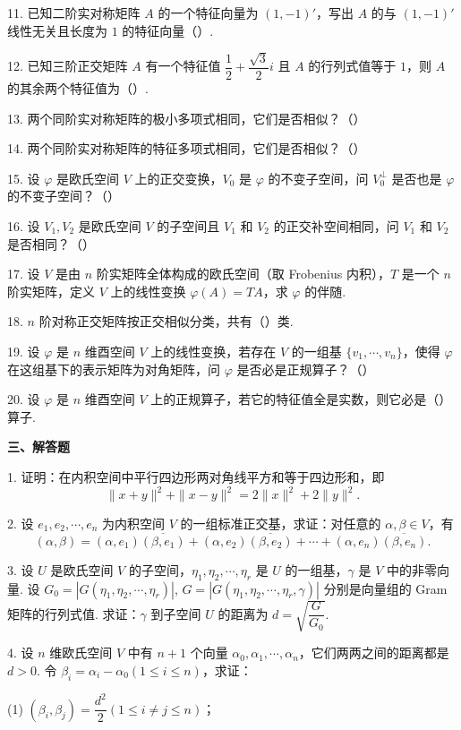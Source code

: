 \documentclass[UTF8, 12pt, fontset=fandol, oneside]{ctexart}
\begin{document}
11. 已知二阶实对称矩阵 $A$ 的一个特征向量为 $(1,-1)'$，写出 $A$ 的与 $(1,-1)'$ 线性无关且长度为 $1$ 的特征向量（\quad ）.

12. 已知三阶正交矩阵 $A$ 有一个特征值 $\dfrac{1}{2}+\dfrac{\sqrt{3}}{2}i$ 且 $A$ 的行列式值等于 $1$，则 $A$ 的其余两个特征值为（\quad ）.

13. 两个同阶实对称矩阵的极小多项式相同，它们是否相似？（\quad ）

14. 两个同阶实对称矩阵的特征多项式相同，它们是否相似？（\quad ）

15. 设 $\varphi$ 是欧氏空间 $V$ 上的正交变换，$V_0$ 是 $\varphi$ 的不变子空间，问 $V_0^\perp$ 是否也是 $\varphi$ 的不变子空间？（\quad ）

16. 设 $V_1,V_2$ 是欧氏空间 $V$ 的子空间且 $V_1$ 和 $V_2$ 的正交补空间相同，问 $V_1$ 和 $V_2$ 是否相同？（\quad ）

17. 设 $V$ 是由 $n$ 阶实矩阵全体构成的欧氏空间（取 Frobenius 内积），$T$ 是一个 $n$ 阶实矩阵，定义 $V$ 上的线性变换 $\varphi(A)=TA$，求 $\varphi$ 的伴随.

18. $n$ 阶对称正交矩阵按正交相似分类，共有（\quad ）类.

19. 设 $\varphi$ 是 $n$ 维酉空间 $V$ 上的线性变换，若存在 $V$ 的一组基 $\{v_1,\cdots,v_n\}$，使得 $\varphi$ 在这组基下的表示矩阵为对角矩阵，问 $\varphi$ 是否必是正规算子？（\quad ）

20. 设 $\varphi$ 是 $n$ 维酉空间 $V$ 上的正规算子，若它的特征值全是实数，则它必是（\quad ）算子.

\noindent\textbf{三、解答题}

1. 证明：在内积空间中平行四边形两对角线平方和等于四边形和，即
\[
\|x+y\|^2+\|x-y\|^2=2\|x\|^2+2\|y\|^2.
\]

2. 设 $e_1,e_2,\cdots,e_n$ 为内积空间 $V$ 的一组标准正交基，求证：对任意的 $\alpha,\beta\in V$，有
\[
(\alpha,\beta)=(\alpha,e_1)\overline{(\beta,e_1)}+(\alpha,e_2)\overline{(\beta,e_2)}+\cdots+(\alpha,e_n)\overline{(\beta,e_n)}.
\]

3. 设 $U$ 是欧氏空间 $V$ 的子空间，$\eta_1,\eta_2,\cdots,\eta_r$ 是 $U$ 的一组基，$\gamma$ 是 $V$ 中的非零向量. 设 $G_0=|G(\eta_1,\eta_2,\cdots,\eta_r)|$, $G=|G(\eta_1,\eta_2,\cdots,\eta_r,\gamma)|$ 分别是向量组的 Gram 矩阵的行列式值. 求证：$\gamma$ 到子空间 $U$ 的距离为 $d=\sqrt{\dfrac{G}{G_0}}$.

4. 设 $n$ 维欧氏空间 $V$ 中有 $n+1$ 个向量 $\alpha_0,\alpha_1,\cdots,\alpha_n$，它们两两之间的距离都是 $d>0$. 令 $\beta_i=\alpha_i-\alpha_0(1\le i\le n)$，求证：

(1) $(\beta_i,\beta_j)=\dfrac{d^2}{2}(1\le i\ne j\le n)$；
\end{document}
